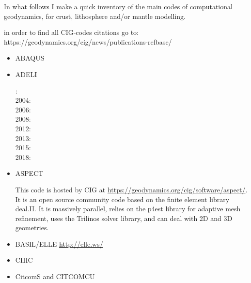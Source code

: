 
In what follows I make a quick inventory of the main codes of computational geodynamics, 
for crust, lithosphere and/or mantle modelling.

in order to find all CIG-codes citations go to: https://geodynamics.org/cig/news/publications-refbase/

\begin{itemize}

\item ABAQUS

\cite{gedh02}
\cite{fumr03}
\cite{camg07}
\cite{kuhe09}
\cite{camg10}
\cite{makh09}
\cite{nalr12}
\cite{pevp15}


\item ADELI

: \cite{hajc97}\\
2004: \cite{gocl04}\\
2006: \cite{vech06} \\
2008: \cite{boht08a}\cite{boht08b}\\
2012: \cite{gech12}\cite{gigh12}\\
2013: \cite{wahd13}\\
2015: \cite{ceag15}\\
2018: \cite{cegm18}\cite{gehn18}

\item ASPECT

This code is hosted by CIG at \url{https://geodynamics.org/cig/software/aspect/}. 
It is an open source community code based on the finite element library deal.II. 
It is massively parallel, relies on the p4est library for adaptive mesh refinement,
uses the Trilinos solver library, and can deal with 2D and 3D geometries. 

\cite{bahk07}
\cite{krhb12}
\cite{aupm15}
\cite{tosn15}
\cite{dahe16}
\cite{gadb16}
\cite{zhon16}
\cite{hepb17}
\cite{daef17}
\cite{hedg17}
\cite{robh17}
\cite{robu17}
\cite{aumh17}
\cite{thie17}
\cite{brsg17}
\cite{onmz17}
\cite{tasm17}
\cite{zhli17}
\cite{daga18}
\cite{onzh18}
\cite{gltf18}
\cite{heps18}
\cite{galh18}
\cite{peka18}
\cite{puth18}
\cite{brst18b}
\cite{baba19}
\cite{stbl19}
\cite{cocf19}
\cite{liki19}

\item BASIL/ELLE \url{http://elle.ws/}
\cite{bokj08}
\cite{llor19}

\item CHIC 
\cite{norv15}

\item CitcomS and CITCOMCU


\end{itemize}
